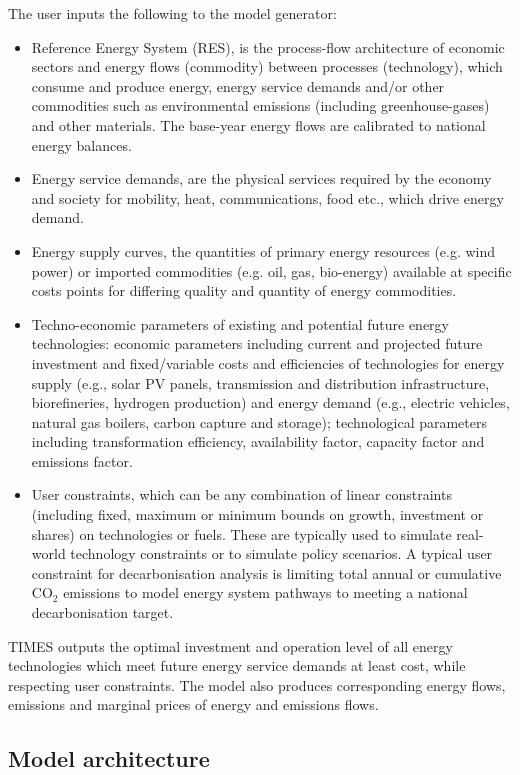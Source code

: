 \documentclass[gmd,manuscript]{copernicus}
\begin{document}
The user inputs the following to the model generator:
\begin{itemize}
 \item Reference Energy System (RES), is the process-flow architecture of economic sectors and energy flows (commodity) between processes (technology), which consume and produce energy, energy service demands and/or other commodities such as environmental emissions (including greenhouse-gases) and other materials. The base-year energy flows are calibrated to national energy balances.
 \item Energy service demands, are the physical services required by the economy and society for mobility, heat, communications, food etc., which drive energy demand. 
 \item Energy supply curves, the quantities of primary energy resources (e.g. wind power) or imported commodities (e.g. oil, gas, bio-energy) available at specific costs points for differing quality and quantity of energy commodities.
 \item Techno-economic parameters of existing and potential future energy technologies: economic parameters including current and projected future investment and fixed/variable costs and efficiencies of technologies for energy supply (e.g., solar PV panels, transmission and distribution infrastructure, biorefineries, hydrogen production) and energy demand (e.g., electric vehicles, natural gas boilers, carbon capture and storage); technological parameters including transformation efficiency, availability factor, capacity factor and emissions factor. 
 \item User constraints, which can be any combination of linear constraints (including fixed, maximum or minimum bounds on growth, investment or shares) on technologies or fuels. These are typically used to simulate real-world technology constraints or to simulate policy scenarios. A typical user constraint for decarbonisation analysis is limiting total annual or cumulative CO$_2$ emissions to model energy system pathways to meeting a national decarbonisation target.
\end{itemize} 

TIMES outputs the optimal investment and operation level of all energy technologies which meet future energy service demands at least cost, while respecting user constraints. The model also produces corresponding energy flows, emissions and marginal prices of energy and emissions flows. 

\subsection{Model architecture}
\label{ss:system_overview}
\end{document}
